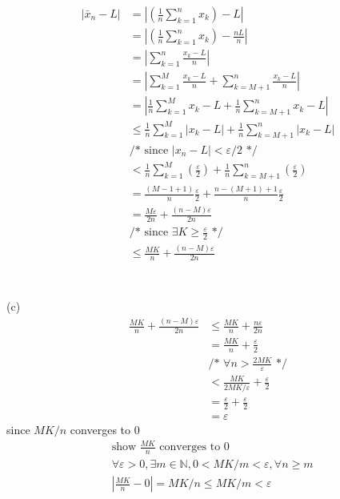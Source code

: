 \documentclass[12pt, border = 4pt, multi]{article} %
\begin{document}
\begin{align*}
|\bar{x}_n - L| &= \left|\left(\frac{1}{n}\sum_{k = 1} ^ n x_k\right) - L\right|\\
&= \left|\left(\frac{1}{n}\sum_{k = 1} ^ n x_k\right) - \frac{nL}{n}\right|\\
&= \left|\sum_{k = 1} ^ n\frac{x_k - L}{n}\right|\\
&= \left|\sum_{k = 1} ^ M\frac{x_k - L}{n} + \sum_{k = M + 1} ^ n\frac{x_k - L}{n}\right|\\
&= \left|\frac{1}{n}\sum_{k = 1} ^ M x_k - L + \frac{1}{n}\sum_{k = M + 1} ^ n x_k - L\right|\\
&\leq \frac{1}{n}\sum_{k = 1} ^ M |x_k - L| + \frac{1}{n}\sum_{k = M + 1} ^ n |x_k - L|\\
&\text{/* since } |x_n - L| < \varepsilon / 2 \text{ */}\\
&< \frac{1}{n}\sum_{k = 1} ^ M \left(\frac{\varepsilon}{2}\right) + \frac{1}{n}\sum_{k = M + 1} ^ n \left(\frac{\varepsilon}{2}\right)\\
&= \frac{(M - 1 + 1)}{n}\frac{\varepsilon}{2} + \frac{n - (M + 1) + 1}{n}\frac{\varepsilon}{2}\\
&= \frac{M\varepsilon}{2n} + \frac{(n - M)\varepsilon}{2n}\\
&\text{/* since } \exists K \geq \frac{\varepsilon}{2} \text{ */}\\
&\leq \frac{MK}{n} + \frac{(n - M)\varepsilon}{2n}\\
\end{align*}
\\
\\
(c)
\begin{align*}
\frac{MK}{n} + \frac{(n - M)\varepsilon}{2n} &\leq \frac{MK}{n} + \frac{n\varepsilon}{2n}\\
&= \frac{MK}{n} + \frac{\varepsilon}{2}\\
&\text{/* }\forall n > \frac{2MK}{\varepsilon}\text{ */}\\
&< \frac{MK}{2MK / \varepsilon} + \frac{\varepsilon}{2}\\
&= \frac{\varepsilon}{2} + \frac{\varepsilon}{2}\\
&= \varepsilon
\end{align*}
since $MK / n$ converges to 0
\begin{align*}
&\text{show } \frac{MK}{n} \text{ converges to 0}\\
&\forall \varepsilon > 0, \exists m \in \mathbb{N}, 0 < MK / m < \varepsilon, \forall n \geq m\\
&\left|\frac{MK}{n} - 0\right| = MK / n \leq MK / m < \varepsilon
\end{align*}
\end{document}
